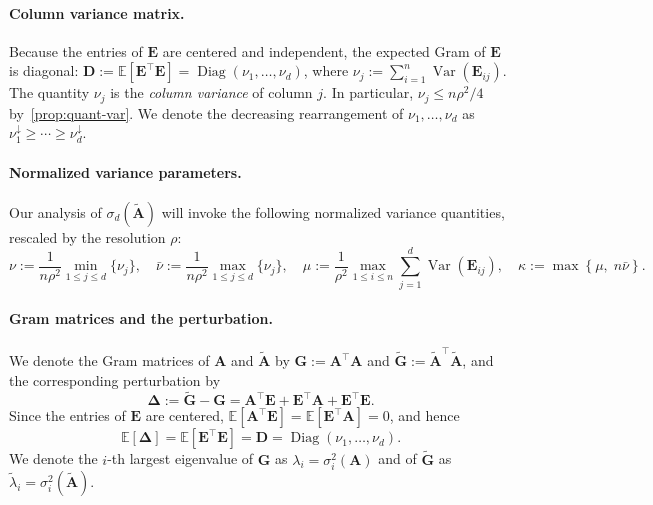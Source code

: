 \documentclass{article}
\newcommand{\Ex}[1]{\mbox{}\mathbb{E}\left[#1\right]}
\newcommand{\Var}{\operatorname{Var}}   %
\newcommand{\Diag}{\operatorname{Diag}} %
\newcommand{\Ab}{\mathbf{A}}
\newcommand{\Db}{\mathbf{D}}
\newcommand{\Eb}{\mathbf{E}}
\newcommand{\Gb}{\mathbf{G}}
\newcommand{\Abtil}{\tilde{\Ab}}
\newcommand{\Gbtil}{\tilde{\Gb}}
\newcommand{\cbr}[1]{\left\{#1\right\}}
\newcommand{\Deltab}{\boldsymbol{\Delta}}
\begin{document}
\paragraph{Column variance matrix.} Because the entries of $\Eb$ are centered and independent, the expected Gram of $\Eb$ is diagonal:
$\Db := \Ex{\Eb^\top \Eb} = \Diag(\nu_1, \dots, \nu_d)$, where $\nu_j := \sum_{i=1}^{n} \Var(\Eb_{ij})$.
The quantity $\nu_j$ is the \emph{column variance} of column $j$. In particular, $\nu_j \le n\rho^2/4$ by~\eqref{prop:quant-var}. We denote the decreasing
rearrangement of $\nu_1,\dots,\nu_d$ as $\nu_1^\downarrow \ge \cdots \ge \nu_d^\downarrow$.

\paragraph{Normalized variance parameters.} Our analysis of $\sigma_d(\Abtil)$ will invoke the following normalized variance quantities, rescaled by the resolution $\rho$:
\begin{equation}\label{def:nu}
    \nu := \frac{1}{n\rho^2}\min_{1\le j\le d}\{\nu_j\},\quad
    \bar\nu := \frac{1}{n\rho^2}\max_{1\le j\le d}\{\nu_j\},\quad
    \mu := \frac{1}{\rho^2}\max_{1\le i\le n}\sum_{j=1}^{d} \Var(\Eb_{ij}),\quad \kappa := \max\cbr{\mu,\; n\bar\nu}.
\end{equation}

\paragraph{Gram matrices and the perturbation.} We denote the Gram matrices of $\Ab$ and $\Abtil$ by $\Gb := \Ab^\top \Ab$ and $\Gbtil := \Abtil^\top \Abtil$, and the corresponding perturbation by
\begin{equation*}
    \Deltab := \Gbtil - \Gb = \Ab^\top \Eb + \Eb^\top \Ab + \Eb^\top \Eb.
\end{equation*}
Since the entries of $\Eb$ are centered, $\Ex{\Ab^\top \Eb} = \Ex{\Eb^\top \Ab} = 0$, and hence
\begin{equation*}
    \Ex{\Deltab} = \Ex{\Eb^\top \Eb} = \Db = \Diag(\nu_1, \dots, \nu_d).
\end{equation*}
We denote the $i$-th largest eigenvalue of $\Gb$ as $\lambda_i = \sigma_i^2(\Ab)$ and of $\Gbtil$ as $\tilde{\lambda}_i = \sigma_i^2(\Abtil)$.
\end{document}
